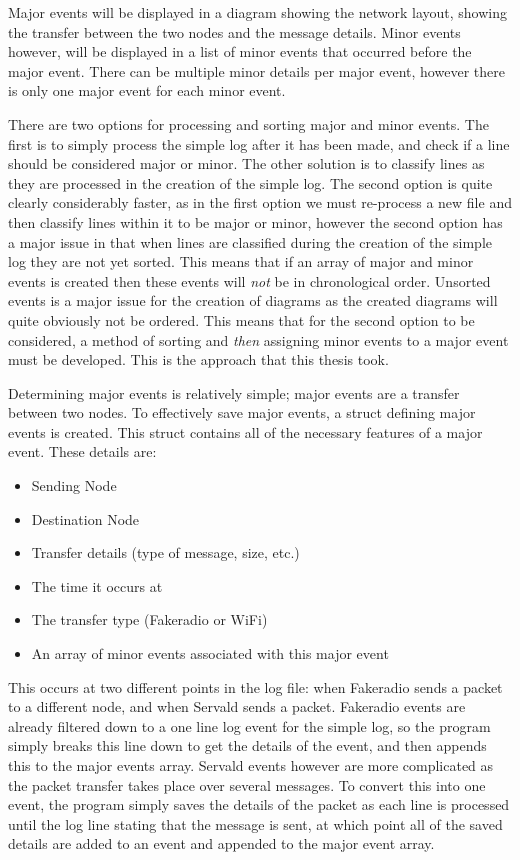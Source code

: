 Major events will be displayed in a diagram showing the network layout, showing the transfer between the two nodes and the message details. 
Minor events however, will be displayed in a list of minor events that occurred before the major event.
There can be multiple minor details per major event, however there is only one major event for each minor event.

There are two options for processing and sorting major and minor events.
The first is to simply process the simple log after it has been made, and check if a line should be considered major or minor. 
The other solution is to classify lines as they are processed in the creation of the simple log.
The second option is quite clearly considerably faster, as in the first option we must re-process a new file and then classify lines within it to be major or minor, however the second option has a major issue in that when lines are classified during the creation of the simple log they are not yet sorted.
This means that if an array of major and minor events is created then these events will \emph{not} be in chronological order.
Unsorted events is a major issue for the creation of diagrams as the created diagrams will quite obviously not be ordered.
This means that for the second option to be considered, a method of sorting and \emph{then} assigning minor events to a major event must be developed.
This is the approach that this thesis took.

Determining major events is relatively simple; major events are a transfer between two nodes.
To effectively save major events, a struct defining major events is created.
This struct contains all of the necessary features of a major event. These details are:
\begin{itemize}
    \item Sending Node
    \item Destination Node
    \item Transfer details (type of message, size, etc.)
    \item The time it occurs at
    \item The transfer type (Fakeradio or WiFi)
    \item An array of minor events associated with this major event
\end{itemize}
This occurs at two different points in the log file: when Fakeradio sends a packet to a different node, and when Servald sends a packet.
Fakeradio events are already filtered down to a one line log event for the simple log, so the program simply breaks this line down to get the details of the event, and then appends this to the major events array.
Servald events however are more complicated as the packet transfer takes place over several messages.
To convert this into one event, the program simply saves the details of the packet as each line is processed until the log line stating that the message is sent, at which point all of the saved details are added to an event and appended to the major event array.


